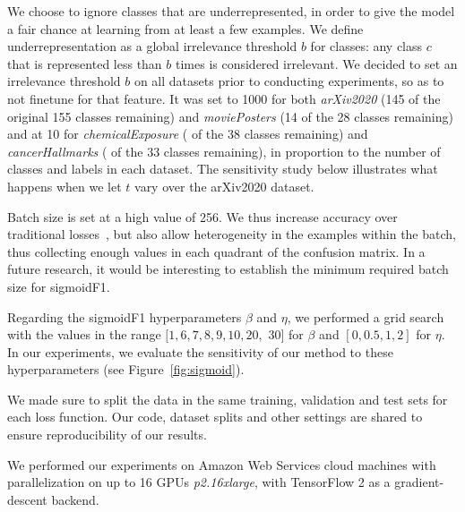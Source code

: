We choose to ignore classes that are underrepresented, in order to give the model a fair chance at learning from at least a few examples. We define underrepresentation as a global irrelevance threshold $b$ for classes: any class $c$ that is represented less than $b$ times is considered irrelevant. We decided to set an irrelevance threshold $b$ on all datasets prior to conducting experiments, so as to not finetune for that feature. It was set to 1000 for both \emph{arXiv2020} (145 of the original 155 classes remaining) and \emph{moviePosters} (14 of the 28 classes remaining) and at 10 for \emph{chemicalExposure} ( of the 38 classes remaining) and \emph{cancerHallmarks} ( of the 33 classes remaining), in proportion to the number of classes and labels in each dataset. The sensitivity study below illustrates what happens when we let $t$ vary over the arXiv2020 dataset.

Batch size is set at a high value of 256. We thus increase accuracy over traditional losses~\cite{bigBS}, but also allow heterogeneity in the examples within the batch, thus collecting enough values in each quadrant of the confusion matrix. In a future research, it would be interesting to establish the minimum required batch size for sigmoidF1.  

Regarding the sigmoidF1 hyperparameters $\beta$ and $\eta$, we performed a grid search with the values in the range $[1, 6, 7, 8, 9, 10, 20,$ $30]$ for $\beta$ and $[0, 0.5, 1, 2]$ for $\eta$.
In our experiments, we evaluate the sensitivity of our method to these hyperparameters (see Figure~\ref{fig:sigmoid}).

We made sure to split the data in the same training, validation and test sets for each loss function. Our code, dataset splits and other settings are shared to ensure reproducibility of our results. 

We performed our experiments on Amazon Web Services cloud machines with parallelization on up to 16 GPUs \textit{p2.16xlarge}, with TensorFlow 2 as a gradient-descent backend.
